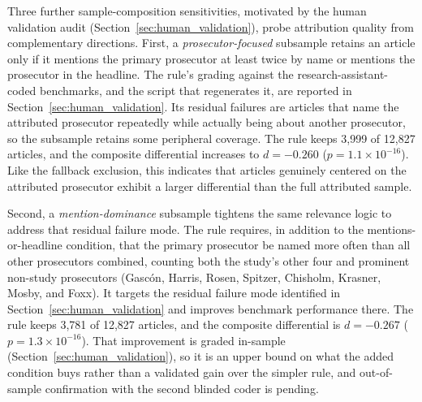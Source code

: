 \documentclass[12pt, letterpaper]{article}
\begin{document}
\begin{appendices}
Three further sample-composition sensitivities, motivated by the human validation audit (Section~\ref{sec:human_validation}), probe attribution quality from complementary directions. First, a \emph{prosecutor-focused} subsample retains an article only if it mentions the primary prosecutor at least twice by name or mentions the prosecutor in the headline. The rule's grading against the research-assistant-coded benchmarks, and the script that regenerates it, are reported in Section~\ref{sec:human_validation}. Its residual failures are articles that name the attributed prosecutor repeatedly while actually being about another prosecutor, so the subsample retains some peripheral coverage. The rule keeps 3{,}999 of 12{,}827 articles, and the composite differential increases to $d = -0.260$ ($p = 1.1\times 10^{-16}$). Like the fallback exclusion, this indicates that articles genuinely centered on the attributed prosecutor exhibit a larger differential than the full attributed sample.

Second, a \emph{mention-dominance} subsample tightens the same relevance logic to address that residual failure mode. The rule requires, in addition to the mentions-or-headline condition, that the primary prosecutor be named more often than all other prosecutors combined, counting both the study's other four and prominent non-study prosecutors (Gasc\'{o}n, Harris, Rosen, Spitzer, Chisholm, Krasner, Mosby, and Foxx). It targets the residual failure mode identified in Section~\ref{sec:human_validation} and improves benchmark performance there. The rule keeps 3{,}781 of 12{,}827 articles, and the composite differential is $d = -0.267$ ($p = 1.3\times 10^{-16}$). That improvement is graded in-sample (Section~\ref{sec:human_validation}), so it is an upper bound on what the added condition buys rather than a validated gain over the simpler rule, and out-of-sample confirmation with the second blinded coder is pending.


\end{appendices}
\end{document}
